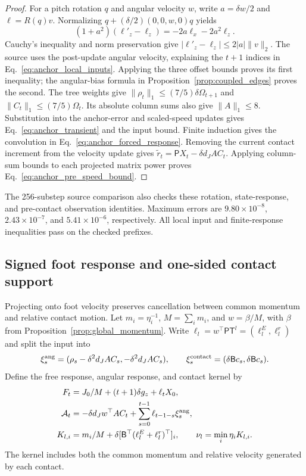 \begin{proof}
For a pitch rotation $q$ and angular velocity $w$, write $a=\delta w/2$ and $\ell=R(q)v$.
Normalizing $q+(\delta/2)(0,0,w,0)q$ yields
\begin{equation}
 (1+a^2)(\ell'_z-\ell_z)=-2a\ell_x-2a^2\ell_z.
\end{equation}
Cauchy's inequality and norm preservation give $|\ell'_z-\ell_z|\le2|a|\|v\|_2$.
The source uses the post-update angular velocity, explaining the $t+1$ indices in Eq.~\eqref{eq:anchor_local_inputs}.
Applying the three offset bounds proves its first inequality; the angular-bias formula in Proposition~\ref{prop:coupled_edges} proves the second.
The tree weights give $\|\rho_t\|_1\le(7/5)\delta\Omega_{t+1}$ and $\|C_t\|_1\le(7/5)\Omega_t$.
Its absolute column sums also give $\|A\|_1\le8$.
Substitution into the anchor-error and scaled-speed updates gives Eq.~\eqref{eq:anchor_transient} and the input bound.
Finite induction gives the convolution in Eq.~\eqref{eq:anchor_forced_response}.
Removing the current contact increment from the velocity update gives $\widetilde r_t=\mathsf P X_t-\delta d_JAC_t$.
Applying column-sum bounds to each projected matrix power proves Eq.~\eqref{eq:anchor_pre_speed_bound}.
\end{proof}

The 256-substep source comparison also checks these rotation, state-response, and pre-contact observation identities.
Maximum errors are $9.80\times10^{-8}$, $2.43\times10^{-7}$, and $5.41\times10^{-6}$, respectively.
All local input and finite-response inequalities pass on the checked prefixes.

\subsection{Signed foot response and one-sided contact support}
\label{app:signed_response}

Projecting onto foot velocity preserves cancellation between common momentum and relative contact motion.
Let $m_i=\eta_i^{-1}$, $M=\sum_i m_i$, and $w=\beta/M$, with $\beta$ from Proposition~\ref{prop:global_momentum}.
Write $\ell_l=w^\top\mathsf P\mathsf T^l=(\ell_l^E,\ell_l^r)$ and split the input into
\begin{equation}
 \xi_s^{\rm ang}=(\rho_s-\delta^2d_JAC_s,-\delta^2d_JAC_s),
 \qquad \xi_s^{\rm contact}=(\delta\mathsf Bc_s,\delta\mathsf Bc_s).
\end{equation}
Define the free response, angular response, and contact kernel by
\begin{align}
 F_t&=J_0/M+(t+1)\delta g_z+\ell_tX_0,\nonumber\\
 \mathcal A_t&=-\delta d_Jw^\top AC_t+
     \sum_{s=0}^{t-1}\ell_{t-1-s}\xi_s^{\rm ang},\nonumber\\
 K_{l,i}&=m_i/M+\delta[\mathsf B^\top(\ell_l^E+\ell_l^r)^\top]_i,
 \qquad \nu_l=\min_i\eta_iK_{l,i}.
 \label{eq:foot_response_channels}
\end{align}
The kernel includes both the common momentum and relative velocity generated by each contact.

